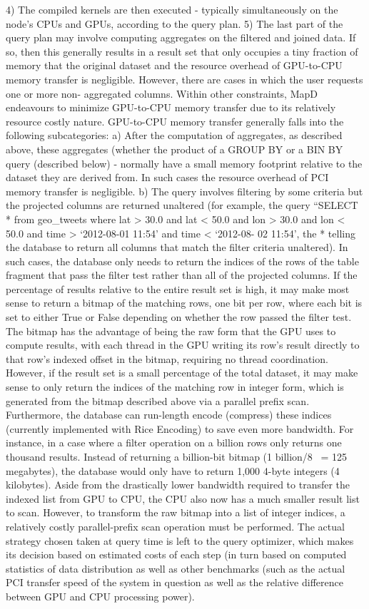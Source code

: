 \documentclass[twocolumn]{article}
\begin{document}
4) The compiled kernels are then executed - typically simultaneously on the node’s CPUs and GPUs, according to the query plan.
5) The last part of the query plan may involve computing aggregates on the filtered and joined data. If so, then this generally results in a result set that only occupies a tiny fraction of memory that the original dataset and the resource overhead of GPU-to-CPU memory transfer is negligible. However, there are cases in which the user requests one or more non- aggregated columns. Within other constraints, MapD endeavours to minimize GPU-to-CPU memory transfer due to its relatively resource costly nature. GPU-to-CPU memory transfer generally falls into the following subcategories:
a) After the computation of aggregates, as described above, these aggregates (whether the product of a GROUP BY or a BIN BY query (described below) - normally have a small memory footprint relative to the dataset they are derived from. In such cases the resource overhead of PCI memory transfer is negligible.
b) The query involves filtering by some criteria but the projected columns are returned unaltered (for example, the query “SELECT * from geo\_tweets where lat > 30.0 and lat < 50.0 and lon > 30.0 and lon < 50.0 and time > ‘2012-08-01 11:54’ and time < ‘2012-08- 02 11:54’, the * telling the database to return all columns that match the filter criteria unaltered). In such cases, the database only needs to return the indices of the rows of the table fragment that pass the filter test rather than all of the projected columns. If the percentage of results relative to the entire result set is high, it may make most sense to return a bitmap of the matching rows, one bit per row, where each bit is set to either True or False depending on whether the row passed the filter test. The bitmap has the advantage of being the raw form that the GPU uses to compute results, with each thread in the GPU writing its row’s result directly to that row’s indexed offset in the bitmap, requiring no thread coordination. However, if the result set is a small percentage of the total dataset, it may make sense to only return the indices of the matching row in integer form, which is generated from the bitmap described above via a parallel prefix scan. Furthermore, the database can run-length encode (compress) these indices (currently implemented with Rice Encoding) to save even more bandwidth. For instance, in a case where a filter operation on a billion rows only returns one thousand results. Instead of returning a billion-bit bitmap (1 billion/8 ~= 125 megabytes), the database would only have to return 1,000 4-byte integers (4 kilobytes). Aside from the drastically lower bandwidth required to transfer the indexed list from GPU to CPU, the CPU also now has a much smaller result list to scan. However, to transform the raw bitmap into a list of integer indices, a relatively costly parallel-prefix scan operation must be performed. The actual strategy chosen taken at query time is left to the query optimizer, which makes its decision based on estimated costs of each step (in turn based on computed statistics of data distribution as well as other benchmarks (such as the actual PCI transfer speed of the system in question as well as the relative difference between GPU and CPU processing power).
\end{document}
